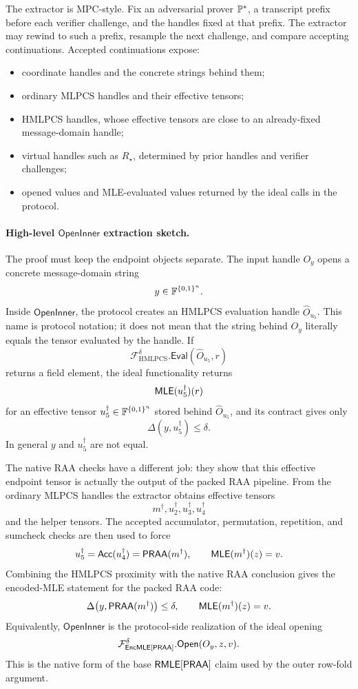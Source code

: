 The extractor is MPC-style.  Fix an adversarial prover \(\mathbb{P}^\ast\), a
transcript prefix before each verifier challenge, and the handles fixed at that
prefix.  The extractor may rewind to such a prefix, resample the next
challenge, and compare accepting continuations.  Accepted continuations expose:
\begin{itemize}[leftmargin=*]
  \item coordinate handles and the concrete strings behind them;
  \item ordinary MLPCS handles and their effective tensors;
  \item HMLPCS handles, whose effective tensors are close to an already-fixed
        message-domain handle;
  \item virtual handles such as \(R_\star\), determined by prior handles and
        verifier challenges;
  \item opened values and MLE-evaluated values returned by the ideal calls in
        the protocol.
\end{itemize}

\paragraph{High-level \(\mathsf{OpenInner}\) extraction sketch.}
The proof must keep the endpoint objects separate.  The input handle
\(O_y\) opens a concrete message-domain string
\[
  y\in\mathbb{F}^{\{0,1\}^n}.
\]
Inside \(\mathsf{OpenInner}\), the protocol creates an HMLPCS evaluation handle
\(\widehat O_{u_5}\).  This name is protocol notation; it does not mean that
the string behind \(O_y\) literally equals the tensor evaluated by the handle.
If
\[
  \mathcal F_{\mathrm{HMLPCS}}^\delta.\mathsf{Eval}
    (\widehat O_{u_5},r)
\]
returns a field element, the ideal functionality returns
\[
  \mathsf{MLE}(u_5^\dagger)(r)
\]
for an effective tensor \(u_5^\dagger\in\mathbb{F}^{\{0,1\}^n}\) stored behind
\(\widehat O_{u_5}\), and its contract gives only
\[
  \Delta(y,u_5^\dagger)\le\delta.
\]
In general \(y\) and \(u_5^\dagger\) are not equal.

The native RAA checks have a different job: they show that this effective
endpoint tensor is actually the output of the packed RAA pipeline.  From the
ordinary MLPCS handles the extractor obtains effective tensors
\[
  m^\dagger,u_2^\dagger,u_3^\dagger,u_4^\dagger
\]
and the helper tensors.  The accepted accumulator, permutation, repetition, and
sumcheck checks are then used to force
\[
  u_5^\dagger
  =
  \mathsf{Acc}(u_4^\dagger)
  =
  \mathsf{PRAA}(m^\dagger),
  \qquad
  \mathsf{MLE}(m^\dagger)(z)=v.
\]
Combining the HMLPCS proximity with the native RAA conclusion gives the
encoded-MLE statement for the packed RAA code:
\[
  \Delta\bigl(y,\mathsf{PRAA}(m^\dagger)\bigr)\le\delta,
  \qquad
  \mathsf{MLE}(m^\dagger)(z)=v.
\]
Equivalently, \(\mathsf{OpenInner}\) is the protocol-side realization of the
ideal opening
\[
  \mathcal F_{\mathsf{EncMLE}[\mathsf{PRAA}]}^\delta.\mathsf{Open}(O_y,z,v).
\]
This is the native form of the base \(\mathsf{RMLE}[\mathsf{PRAA}]\) claim used by the outer
row-fold argument.

